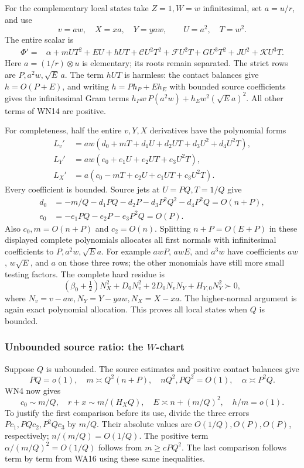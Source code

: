 For the complementary local states take \(Z=1,W=w\) infinitesimal,
set \(a=u/r\), and use
\[
 v=aw,\quad X=xa,\quad Y=yaw,\qquad U=a^2,\quad T=w^2.
 \tag{WN13}
\]
The entire scalar is
\[
\begin{split}
 \Phi'={}&\alpha+mUT^2+EU+hUT+\mathcal C U^2T^2
       +\mathcal F U^2T+GU^3T^2+JU^2+\mathcal K U^3T .
\end{split}\tag{WN14}
\]
Here \(a=(1/r)\otimes u\) is elementary; its roots remain separated.
The strict rows are \(P,a^2w,\sqrt E\,a\).
The term \(hUT\) is harmless: the contact balances give
\(h=O(P+E)\), and writing \(h=Ph_P+Eh_E\) with bounded source
coefficients gives the infinitesimal Gram terms
\(h_Pw\,P(a^2w)+h_Ew^2(\sqrt E a)^2\).
All other terms of WN14 are positive.

For completeness, half the entire \(v,Y,X\) derivatives have
the polynomial forms
\[
\begin{aligned}
 L_v'&=aw(d_0+mT+d_1U+d_2UT+d_3U^2+d_4U^2T),\\
 L_Y'&=aw(e_0+e_1U+e_2UT+e_3U^2T),\\
 L_X'&=a(c_0-mT+c_2U+c_1UT+c_3U^2T).
\end{aligned}\tag{WN15}
\]
Every coefficient is bounded. Source jets at
\(U=PQ,T=1/Q\) give
\[
\begin{split}
d_0&=-m/Q-d_1PQ-d_2P-d_3P^2Q^2-d_4P^2Q=O(n+P),\\
e_0&=-e_1PQ-e_2P-e_3P^2Q=O(P).
\end{split}
\]
Also \(c_0,m=O(n+P)\) and \(c_2=O(n)\).
Splitting \(n+P=O(E+P)\) in these displayed complete polynomials
allocates all first normals with infinitesimal coefficients to
\(P,a^2w,\sqrt E a\). For example \(awP\), \(awE\), and
\(a^3w\) have coefficients \(aw\), \(w\sqrt E\), and \(a\)
on those three rows; the other monomials have still more small
testing factors. The complete hard residue is
\[
 (\beta_0+\tfrac12)N_X^2+
 D_0N_v^2+2D_0N_vN_Y+H_{Y,0}N_Y^2\succ0,
 \tag{WN16}
\]
where \(N_v=v-aw,N_Y=Y-yaw,N_X=X-xa\).
The higher-normal argument is again exact polynomial allocation.
This proves all local states when \(Q\) is bounded.

\subsubsection*{Unbounded source ratio: the \(W\)-chart}

Suppose \(Q\) is unbounded. The source estimates and positive
contact balances give
\[
 PQ=o(1),\quad m\asymp Q^2(n+P),\quad nQ^2,PQ^2=O(1),
 \quad \alpha\asymp P^2Q .
 \tag{WN17}
\]
WN4 now gives
\[
 c_0\sim m/Q,\quad r+x\sim m/(H_XQ),\quad
 E\asymp n+(m/Q)^2,\quad h/m=o(1).
 \tag{WN18}
\]
To justify the first comparison before its use, divide the three
errors \(Pc_1,PQc_2,P^2Qc_3\) by \(m/Q\).
Their absolute values are \(O(1/Q),O(P),O(P)\), respectively;
\(n/(m/Q)=O(1/Q)\). The positive term
\(\alpha/(m/Q)^2=O(1/Q)\) follows from
\(m\geq cPQ^2\). The last comparison follows term by term from
WA16 using these same inequalities.

